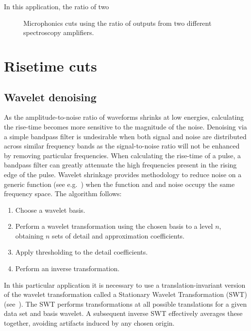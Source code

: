 	In this application, the ratio of two 

			\begin{figure}
				\centering
				\caption{Microphonics cuts using the ratio of outputs from two different spectroscopy amplifiers.}
				\label{fig:RatioOfShapedChannels}
			\end{figure}


	\section{Risetime cuts}
     	\label{sec:RisetimeCuts}	

		\subsection{Wavelet denoising}
	     	\label{sec:RisetimeCutsWaveletDenoise}
					
	As the amplitude-to-noise ratio of waveforms shrinks at low energies, calculating the rise-time becomes more sensitive to the magnitude of the noise.   Denoising via a simple bandpass filter is undesirable when both signal and noise are distributed across similar frequency bands as the signal-to-noise ratio will not be enhanced by removing particular frequencies.  When calculating the rise-time of a pulse, a bandpass filter can greatly attenuate the high frequencies present in the rising edge of the pulse.  Wavelet shrinkage provides methodology to reduce noise on a generic function (see e.g.~\cite{Don95aa,Don95bb}) when the function and and noise occupy the same frequency space.  The algorithm follows:
				\begin{enumerate}
					\item Choose a wavelet basis.
					\item Perform a wavelet transformation using the chosen basis to a level $n$, 
					obtaining $n$ sets of detail and approximation coefficients.
					\item Apply thresholding to the detail coefficients.
					\item Perform an inverse transformation.
				\end{enumerate}
	In this particular application it is necessary to use a translation-invariant version of the wavelet transformation called a Stationary Wavelet Transformation (SWT) (see~\cite{Coif95aa,Naso95aa}).  The SWT performs transformations at all possible translations for a given data set and basis wavelet.  A subsequent inverse SWT effectively averages these together, avoiding artifacts induced by any chosen origin.  
	
